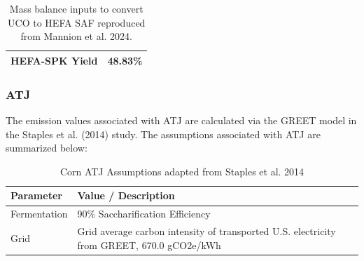 \documentclass[12pt]{article}
\begin{document}
\begin{Appendix}
\begin{table}[H]
\begin{tabular}{|l|r|}
\hline
\textbf{HEFA-SPK Yield} & \textbf{48.83\%} \\
\hline
\end{tabular}

\caption{Mass balance inputs to convert UCO to HEFA SAF reproduced from Mannion et al. 2024.}
\label{tab:saf_production}
\end{table}


\subsubsection{ATJ}

The emission values associated with ATJ are calculated via the GREET model in the Staples et al. (2014) study. The assumptions associated with ATJ are summarized below:

\begin{table}[h!]
\centering
\begin{tabular}{|p{4cm}|p{8cm}|}
\hline
\textbf{Parameter} & \textbf{Value / Description} \\
\hline
Fermentation & 90\% Saccharification Efficiency \\
\hline
Grid & Grid average carbon intensity of transported U.S. electricity from GREET, 670.0 gCO2e/kWh \\
\hline
\end{tabular}
\caption{Corn ATJ Assumptions adapted from Staples et al. 2014}
\label{tab:fermentation_grid}
\end{table}


\end{Appendix}
\end{document}
